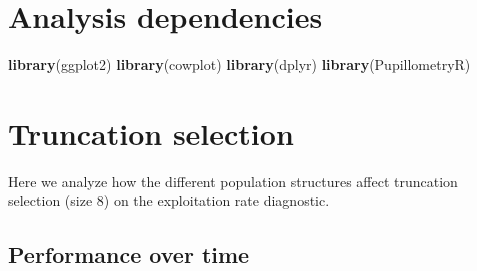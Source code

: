 \documentclass[]{book}
\newenvironment{Shaded}{\begin{snugshade}}{\end{snugshade}}
\newcommand{\KeywordTok}[1]{\textcolor[rgb]{0.13,0.29,0.53}{\textbf{#1}}}
\newcommand{\NormalTok}[1]{#1}
\begin{document}
\hypertarget{analysis-dependencies-4}{%
\section{Analysis dependencies}\label{analysis-dependencies-4}}

\begin{Shaded}
\begin{Highlighting}[]
\KeywordTok{library}\NormalTok{(ggplot2)}
\KeywordTok{library}\NormalTok{(cowplot)}
\KeywordTok{library}\NormalTok{(dplyr)}
\KeywordTok{library}\NormalTok{(PupillometryR)}
\end{Highlighting}
\end{Shaded}

\hypertarget{truncation-selection-4}{%
\section{Truncation selection}\label{truncation-selection-4}}

Here we analyze how the different population structures affect truncation selection (size 8) on the exploitation rate diagnostic.

\hypertarget{performance-over-time-9}{%
\subsection{Performance over time}\label{performance-over-time-9}}
\end{document}
